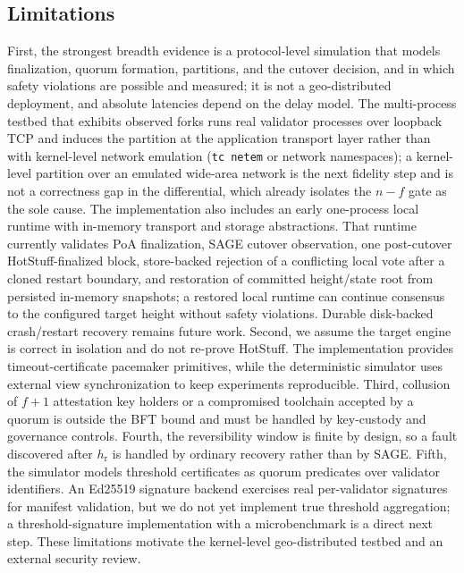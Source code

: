 \documentclass[journal]{IEEEtran}
\begin{document}
\subsection{Limitations}
First, the strongest breadth evidence is a protocol-level simulation that models finalization,
quorum formation, partitions, and the cutover decision, and in which safety violations are
possible and measured; it is not a geo-distributed deployment, and absolute latencies depend on
the delay model. The multi-process testbed that exhibits observed forks runs real validator
processes over loopback TCP and induces the partition at the application transport layer rather
than with kernel-level network emulation (\texttt{tc netem} or network namespaces); a
kernel-level partition over an emulated wide-area network is the next fidelity step and is not a
correctness gap in the differential, which already isolates the $n-f$ gate as the sole cause.
The implementation also includes an early one-process local runtime with
in-memory transport and storage abstractions. That runtime currently validates PoA finalization,
SAGE cutover observation, one post-cutover HotStuff-finalized block, store-backed rejection
of a conflicting local vote after a cloned restart boundary, and restoration of committed
height/state root from persisted in-memory snapshots; a restored local runtime can continue
consensus to the configured target height without safety violations. Durable disk-backed
crash/restart recovery remains future work. Second, we assume the target engine is correct in
isolation and do not re-prove HotStuff. The implementation provides timeout-certificate pacemaker
primitives, while the deterministic simulator uses external view synchronization to keep
experiments reproducible. Third, collusion of $f+1$ attestation key holders or a compromised
toolchain accepted by a quorum is outside the BFT bound and must be handled by key-custody and
governance controls. Fourth, the reversibility window is finite by design, so a fault discovered
after $h_{\mathrm{r}}$ is handled by ordinary recovery rather than by SAGE. Fifth, the simulator
models threshold certificates as quorum predicates over validator identifiers. An Ed25519
signature backend exercises real per-validator signatures for manifest validation, but we
do not yet implement true threshold aggregation; a threshold-signature implementation with a
microbenchmark is a direct next step. These limitations motivate the kernel-level geo-distributed
testbed and an external security review.

\end{document}
